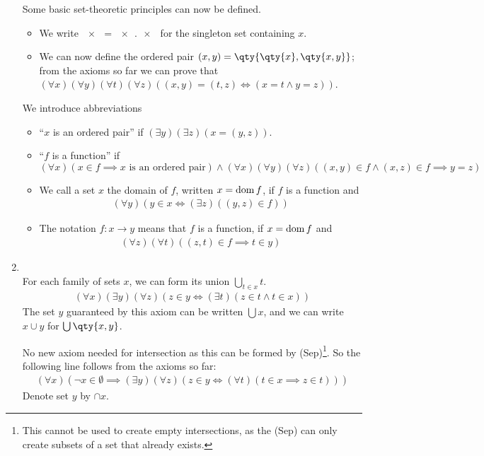 \begin{enumerate}
    Some basic set-theoretic principles can now be defined.
    \begin{itemize}
        \item We write $\qty{x} = \qty{x, x}$ for the singleton set containing $x$.
        \item We can now define the ordered pair $(x, y) = \qty{\qty{x}, \qty{x, y}}$; from the axioms so far we can prove that $(\forall x) (\forall y) (\forall t) (\forall z) ((x, y) = (t, z) \iff (x = t \wedge y = z))$.
    \end{itemize}

    We introduce abbreviations
    \begin{itemize}
        \item ``$x$ is an ordered pair'' if $(\exists y)(\exists z)(x = (y,z))$.
        \item ``$f$ is a function'' if $(\forall x)(x \in f \implies x \text{ is an ordered pair}) \wedge (\forall x)(\forall y)(\forall z)((x,y) \in f \wedge (x,z) \in f \implies y = z)$
        \item We call a set $x$ the domain of $f$, written $x = \operatorname{dom} f$, if $f$ is a function and
        \begin{align*}
            (\forall y)(y \in x \Leftrightarrow (\exists z)((y,z) \in f))
        \end{align*}
        \item The notation $f \colon x \to y$ means that $f$ is a function, if $x = \operatorname{dom} f$ and
        \begin{align*}
            (\forall z)(\forall t)((z, t) \in f \implies t \in y)
        \end{align*}
    \end{itemize}

    \item {} \\
    For each family of sets $x$, we can form its union $\bigcup_{t \in x} t$.
    \begin{align*}
        (\forall x)(\exists y)(\forall z)(z \in y \Leftrightarrow (\exists t)(z \in t \wedge t \in x))
    \end{align*}
    The set $y$ guaranteed by this axiom can be written $\bigcup x$, and we can write $x \cup y$ for $\bigcup \qty{x, y}$.

    \begin{remark}
        No new axiom needed for intersection as this can be formed by (Sep)\footnote{This cannot be used to create empty intersections, as the (Sep) can only create subsets of a set that already exists.}.
        So the following line follows from the axioms so far:
        \begin{align*}
            (\forall x)(\neg x \in \emptyset \implies (\exists y)(\forall z)(z \in y \iff (\forall t)(t \in x \implies z \in t)))
        \end{align*}
        Denote set $y$ by $\cap x$.


\end{remark}
\end{enumerate}
